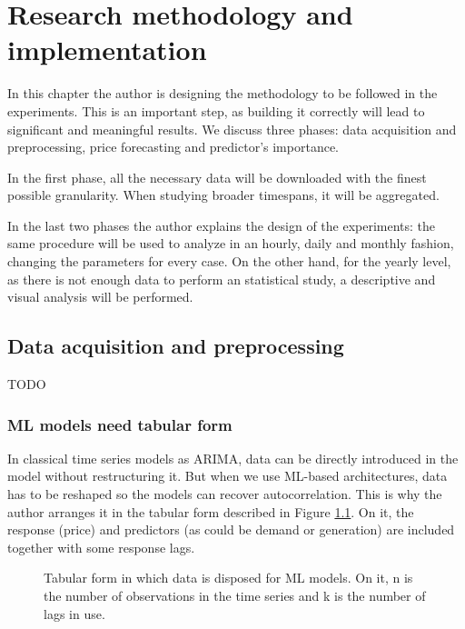 \chapter{Research methodology and implementation}
\label{ch:methodology}
In this chapter the author is designing the methodology to be followed in the experiments. This is an important step, as building it correctly will lead to significant and meaningful results.
We discuss three phases: data acquisition and preprocessing, price forecasting and predictor's importance.

In the first phase, all the necessary data will be downloaded with the finest possible granularity.
When studying broader timespans, it will be aggregated.

In the last two phases the author explains the design of the experiments: the same procedure will be used to analyze in an hourly, daily and monthly fashion, changing the parameters for every case.
On the other hand, for the yearly level, as there is not enough data to perform an statistical study, a descriptive and visual analysis will be performed.

\section{Data acquisition and preprocessing}
TODO

\subsection{ML models need tabular form}
In classical time series models as ARIMA, data can be directly introduced in the model without restructuring it.
But when we use ML-based architectures, data has to be reshaped so the models can recover autocorrelation.
This is why the author arranges it in the tabular form described in Figure \ref{fig:ml-arrangement}.
On it, the response (price) and predictors (as could be demand or generation) are included together with some response lags.

\begin{figure}[H]
\centering
    \caption{Tabular form in which data is disposed for ML models. On it, n is the number of observations in the time series and k is the number of lags in use.}
    \label{fig:ml-arrangement}
\end{figure}


